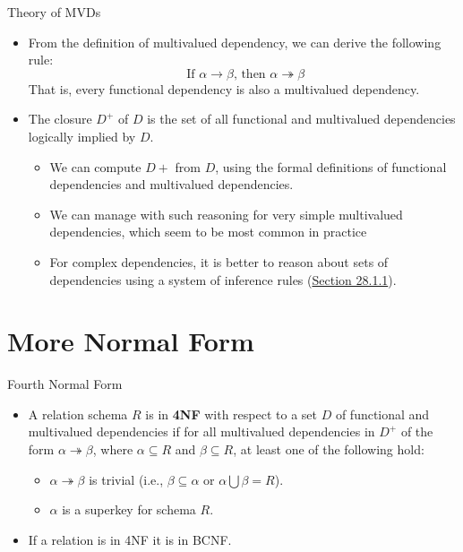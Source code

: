 \documentclass{beamer}
\begin{document}
\begin{frame}{Theory of MVDs}
    \begin{itemize}
        \item From the definition of multivalued dependency, we can derive the following rule:
            \begin{equation*}
                \text{ If } \alpha \rightarrow \beta \text{, then } \alpha \twoheadrightarrow \beta
            \end{equation*}
            That is, every functional dependency is also a multivalued dependency.

        \item The closure $D^+$ of $D$ is the set of all functional and multivalued dependencies logically implied by $D$.
            \begin{itemize}
                \item We can compute $D+$ from $D$, using the formal definitions of functional dependencies and multivalued dependencies.
                \item We can manage with such reasoning for very simple multivalued dependencies, which seem to be most common in practice
                \item For complex dependencies, it is better to reason about sets of dependencies using a system of inference rules (\href{https://db-book.com/online-chapters-dir/28.pdf}{Section 28.1.1}).
            \end{itemize}
    \end{itemize}
\end{frame}

\section{More Normal Form}

\begin{frame}{Fourth Normal Form}
    \begin{itemize}
        \item A relation schema $R$ is in \textbf{4NF} with respect to a set $D$ of functional and multivalued dependencies if for all multivalued dependencies in $D^+$ of the form $\alpha \twoheadrightarrow \beta$, where $\alpha \subseteq R$ and $\beta \subseteq R$, at least one of the following hold:
            \begin{itemize}
                \item $\alpha \twoheadrightarrow \beta$ is trivial (i.e., $\beta \subseteq \alpha$ or $\alpha \bigcup \beta = R$).
                \item $\alpha$ is a superkey for schema $R$.
            \end{itemize}
        \item If a relation is in 4NF it is in BCNF.
    \end{itemize}
\end{frame}
\end{document}

